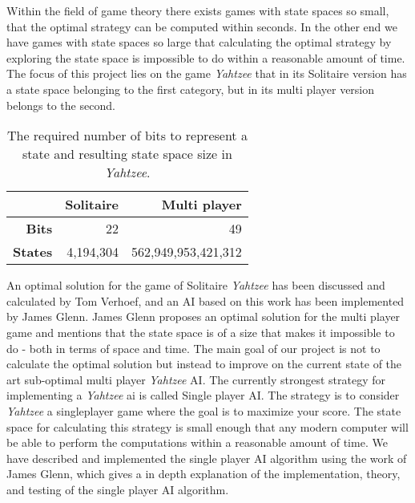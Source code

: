 Within the field of game theory there exists games with state spaces so small, that the optimal strategy can be computed within seconds. 
In the other end we have games with state spaces so large that calculating the optimal strategy by exploring the state space is impossible to do within a reasonable amount of time. 
The focus of this project lies on the game \emph{Yahtzee} that in its Solitaire version has a state space belonging to the first category, but in its multi player version belongs to the second.

\begin{table}[h] %
\centering
\begin{tabular}{|r|r|r|}
\hline
&\textbf{Solitaire} & \textbf{Multi player} 		\\ \hline
\textbf{Bits} 	& 22		&  49 					\\ \hline
\textbf{States} & 4,194,304	&  562,949,953,421,312	\\ \hline	

\end{tabular}
\caption{The required number of bits to represent a state and resulting state space size in \emph{Yahtzee}.}
\end{table}


An optimal solution for the game of Solitaire \emph{Yahtzee} has been discussed and calculated by Tom Verhoef, and an AI based on this work has been implemented by James Glenn.
James Glenn proposes an optimal solution for the multi player game and mentions that the state space is of a size that makes it impossible to do - both in terms of space and time.
The main goal of our project is not to calculate the optimal solution but instead to improve on the current state of the art sub-optimal multi player \emph{Yahtzee} AI. 
The currently strongest strategy for implementing a \emph{Yahtzee} ai is called Single player AI. 
The strategy is to consider \emph{Yahtzee} a singleplayer game where the goal is to maximize your score. 
The state space for calculating this strategy is small enough that any modern computer will be able to perform the computations within a reasonable amount of time. 
We have described and implemented the single player AI algorithm using the work of James Glenn\cite{glenn2006optimal}, which gives a in depth explanation of the implementation, theory, and testing of the single player AI algorithm.

